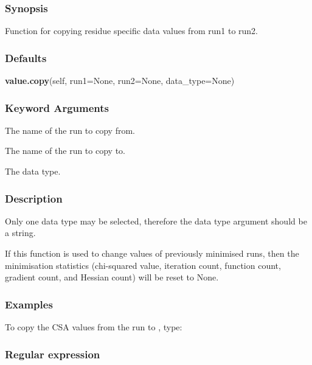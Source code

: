 \subsubsection{Synopsis}

Function for copying residue specific data values from run1 to run2.

\subsubsection{Defaults}

\textsf{\textbf{value.copy}(self, run1=None, run2=None, data\_type=None)}


\subsubsection{Keyword Arguments}


  The name of the run to copy  from.

  The name of the run to copy  to.

  The data type.

\subsubsection{Description}

Only one data type may be selected, therefore the data type argument should be a string.

If this function is used to change values of previously minimised  runs, then the
minimisation  statistics (chi-squared value, iteration count, function count, gradient count,
and Hessian count) will be reset to None.


\subsubsection{Examples}

To copy  the CSA values from the run 
 to 
, type:






\subsubsection{Regular expression}

